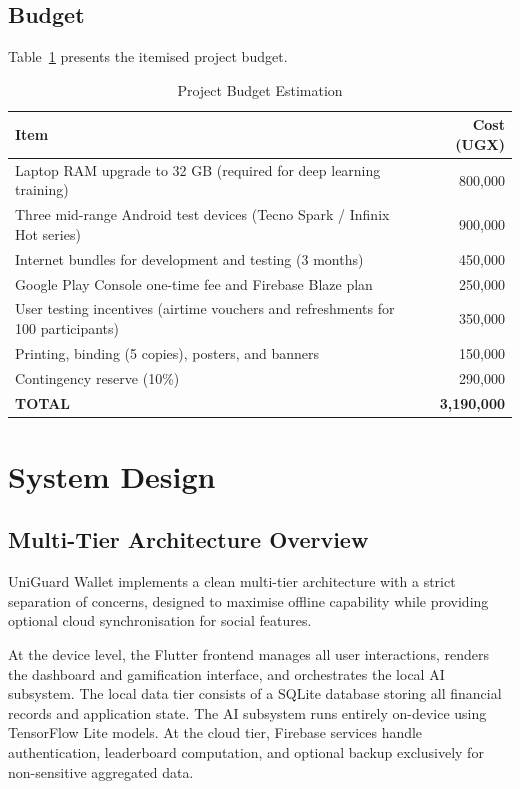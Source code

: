 \documentclass[12pt,a4paper]{report}
\begin{document}
\section{Budget}

Table~\ref{tab:budget} presents the itemised project budget.

\begin{table}[H]
\centering
\caption{Project Budget Estimation}
\label{tab:budget}
\begin{tabular}{p{9cm} r}
\toprule
\textbf{Item} & \textbf{Cost (UGX)} \\
\midrule
Laptop RAM upgrade to 32 GB (required for deep learning training) & 800,000 \\
Three mid-range Android test devices (Tecno Spark / Infinix Hot series) & 900,000 \\
Internet bundles for development and testing (3 months) & 450,000 \\
Google Play Console one-time fee and Firebase Blaze plan & 250,000 \\
User testing incentives (airtime vouchers and refreshments for 100 participants) & 350,000 \\
Printing, binding (5 copies), posters, and banners & 150,000 \\
Contingency reserve (10\%) & 290,000 \\
\midrule
\textbf{TOTAL} & \textbf{3,190,000} \\
\bottomrule
\end{tabular}
\end{table}

\chapter{System Design}

\section{Multi-Tier Architecture Overview}

UniGuard Wallet implements a clean multi-tier architecture with a strict separation of
concerns, designed to maximise offline capability while providing optional cloud
synchronisation for social features.

At the device level, the Flutter frontend manages all user interactions, renders the
dashboard and gamification interface, and orchestrates the local AI subsystem. The
local data tier consists of a SQLite database storing all financial records and application
state. The AI subsystem runs entirely on-device using TensorFlow Lite models. At the
cloud tier, Firebase services handle authentication, leaderboard computation, and
optional backup exclusively for non-sensitive aggregated data.
\end{document}
